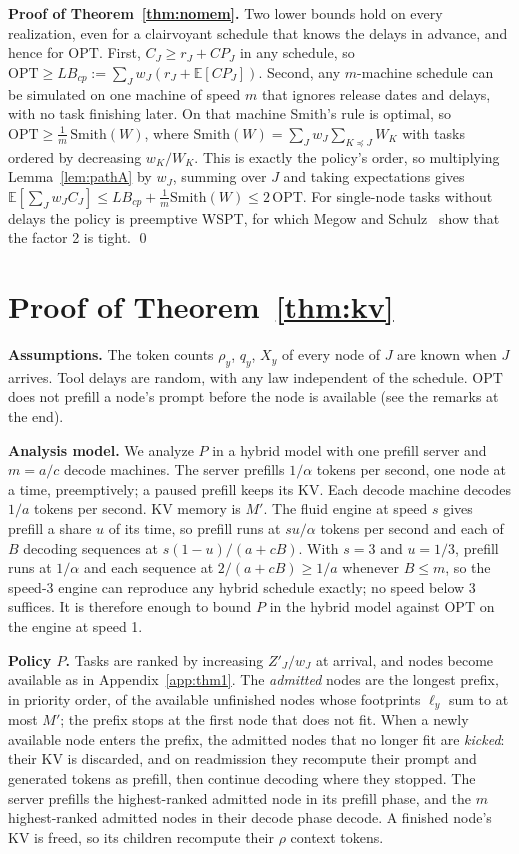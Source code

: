 \documentclass{article}
\newcommand{\OPT}{\mathrm{OPT}}
\begin{document}
\textbf{Proof of Theorem~\ref{thm:nomem}.} Two lower bounds hold on every realization, even for a clairvoyant
schedule that knows the delays in advance, and hence for $\OPT$. First, $C_J \ge r_J + CP_J$ in any schedule, so
$\OPT \ge LB_{cp} := \sum_J w_J (r_J + \mathbb{E}[CP_J])$. Second, any $m$-machine schedule can be simulated on one
machine of speed $m$ that ignores release dates and delays, with no task finishing later. On that machine Smith's
rule is optimal, so $\OPT \ge \frac{1}{m}\,\mathrm{Smith}(W)$, where
$\mathrm{Smith}(W) = \sum_J w_J \sum_{K \preceq J} W_K$ with tasks ordered by decreasing $w_K/W_K$. This is exactly
the policy's order, so multiplying Lemma~\ref{lem:pathA} by $w_J$, summing over $J$ and taking expectations gives
$\mathbb{E}[\sum_J w_J C_J] \le LB_{cp} + \frac{1}{m}\mathrm{Smith}(W) \le 2\,\OPT$. For single-node tasks without
delays the policy is preemptive WSPT, for which Megow and Schulz~\cite{megow2004online} show that the factor 2 is
tight. \qed

\section{Proof of Theorem~\ref{thm:kv}}
\label{app:thm2}

\textbf{Assumptions.} The token counts $\rho_y$, $q_y$, $X_y$ of every node of $J$ are known when $J$ arrives. Tool
delays are random, with any law independent of the schedule. $\OPT$ does not prefill a node's prompt before the
node is available (see the remarks at the end).

\textbf{Analysis model.} We analyze $P$ in a hybrid model with one prefill server and $m = a/c$ decode machines.
The server prefills $1/\alpha$ tokens per second, one node at a time, preemptively; a paused prefill keeps its KV.
Each decode machine decodes $1/a$ tokens per second. KV memory is $M'$. The fluid engine at speed $s$ gives
prefill a share $u$ of its time, so prefill runs at $su/\alpha$ tokens per second and each of $B$ decoding
sequences at $s(1-u)/(a+cB)$. With $s = 3$ and $u = 1/3$, prefill runs at $1/\alpha$ and each sequence at
$2/(a+cB) \ge 1/a$ whenever $B \le m$, so the speed-3 engine can reproduce any hybrid schedule exactly; no speed
below 3 suffices. It is therefore enough to bound $P$ in the hybrid model against $\OPT$ on the engine at speed 1.

\textbf{Policy $P$.} Tasks are ranked by increasing $Z'_J/w_J$ at arrival, and nodes become available as in
Appendix~\ref{app:thm1}. The \emph{admitted} nodes are the longest prefix, in priority order, of the available
unfinished nodes whose footprints $\ell_y$ sum to at most $M'$; the prefix stops at the first node that does not
fit. When a newly available node enters the prefix, the admitted nodes that no longer fit are \emph{kicked}: their
KV is discarded, and on readmission they recompute their prompt and generated tokens as prefill, then continue
decoding where they stopped. The server prefills the highest-ranked admitted node in its prefill phase, and the $m$
highest-ranked admitted nodes in their decode phase decode. A finished node's KV is freed, so its children
recompute their $\rho$ context tokens.
\end{document}
